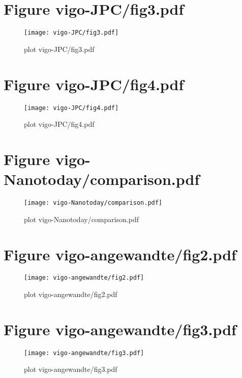 \documentclass[12pt, a4paper]{article}
\begin{document}
\section{Figure vigo-JPC/fig3.pdf}
\begin{figure}[!Hb]
  \centering
  \texttt{[image: vigo-JPC/fig3.pdf]}
  \caption{plot vigo-JPC/fig3.pdf}
\end{figure}


\pagebreak

\section{Figure vigo-JPC/fig4.pdf}
\begin{figure}[!Hb]
  \centering
  \texttt{[image: vigo-JPC/fig4.pdf]}
  \caption{plot vigo-JPC/fig4.pdf}
\end{figure}


\pagebreak

\section{Figure vigo-Nanotoday/comparison.pdf}
\begin{figure}[!Hb]
  \centering
  \texttt{[image: vigo-Nanotoday/comparison.pdf]}
  \caption{plot vigo-Nanotoday/comparison.pdf}
\end{figure}


\pagebreak

\section{Figure vigo-angewandte/fig2.pdf}
\begin{figure}[!Hb]
  \centering
  \texttt{[image: vigo-angewandte/fig2.pdf]}
  \caption{plot vigo-angewandte/fig2.pdf}
\end{figure}


\pagebreak

\section{Figure vigo-angewandte/fig3.pdf}
\begin{figure}[!Hb]
  \centering
  \texttt{[image: vigo-angewandte/fig3.pdf]}
  \caption{plot vigo-angewandte/fig3.pdf}
\end{figure}


\pagebreak
\nocite{*}

\end{document}
